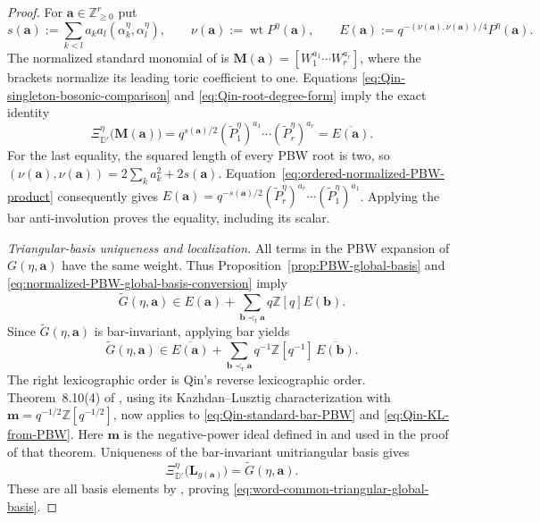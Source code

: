 \documentclass[12pt, reqno]{amsart}
\theoremstyle{plain}
\theoremstyle{definition}
\numberwithin{equation}{section}
\newcommand{\ZZ}{\mathbb{Z}}
\newcommand{\DD}{\mathbb{D}}
\begin{document}
\begin{proof}
For \(\mathbf a\in\ZZ_{\geq0}^r\) put
\[
 s(\mathbf a):=\sum_{k<l}a_ka_l
                         (\alpha_k^\eta,\alpha_l^\eta),
 \qquad
 \nu(\mathbf a):=\operatorname{wt}P^\eta(\mathbf a),
 \qquad
 E(\mathbf a):=q^{-(\nu(\mathbf a),\nu(\mathbf a))/4}
                         P^\eta(\mathbf a).
\]
The normalized standard monomial of
\cite[Section~8.3]{qin2024analogs} is
\(\mathbf M(\mathbf a)=[W_1^{a_1}\cdots W_r^{a_r}]\), where the
brackets normalize its leading toric coefficient to one.
Equations \eqref{eq:Qin-singleton-bosonic-comparison} and
\eqref{eq:Qin-root-degree-form} imply the exact identity
\begin{equation}\label{eq:Qin-standard-bar-PBW}
 \Xi_{\DD'}^\eta\bigl(\mathbf M(\mathbf a)\bigr)
 =q^{s(\mathbf a)/2}
       (\widetilde P_1^\eta)^{a_1}\cdots
       (\widetilde P_r^\eta)^{a_r}
 =\overline{E(\mathbf a)}.
\end{equation}
For the last equality, the squared length of every PBW root is two,
so \((\nu(\mathbf a),\nu(\mathbf a))
 =2\sum_k a_k^2+2s(\mathbf a)\).
Equation~\eqref{eq:ordered-normalized-PBW-product} consequently gives
\(E(\mathbf a)=q^{-s(\mathbf a)/2}
 (\widetilde P_r^\eta)^{a_r}\cdots
 (\widetilde P_1^\eta)^{a_1}\).
Applying the bar anti-involution proves the equality, including its
scalar.

\smallskip
\noindent\emph{Triangular-basis uniqueness and localization.}
All terms in the PBW expansion of \(G(\eta,\mathbf a)\) have the
same weight.  Thus Proposition~\ref{prop:PBW-global-basis} and
\eqref{eq:normalized-PBW-global-basis-conversion} imply
\[
 \widetilde G(\eta,\mathbf a)
 \in E(\mathbf a)+
    \sum_{\mathbf b\prec_{\mathrm r}\mathbf a}q\ZZ[q]E(\mathbf b).
\]
Since \(\widetilde G(\eta,\mathbf a)\) is bar-invariant, applying
bar yields
\begin{equation}\label{eq:Qin-KL-from-PBW}
 \widetilde G(\eta,\mathbf a)
 \in\overline{E(\mathbf a)}+
    \sum_{\mathbf b\prec_{\mathrm r}\mathbf a}
       q^{-1}\ZZ[q^{-1}]\,\overline{E(\mathbf b)}.
\end{equation}
The right lexicographic order is Qin's reverse lexicographic order.
Theorem~8.10(4) of \cite{qin2024analogs}, using its
Kazhdan--Lusztig characterization with
\(\mathbf m=q^{-1/2}\ZZ[q^{-1/2}]\), now applies to
\eqref{eq:Qin-standard-bar-PBW} and \eqref{eq:Qin-KL-from-PBW}.
Here \(\mathbf m\) is the negative-power ideal defined in
\cite[Definition~2.6]{qin2024analogs} and used in the proof of that
theorem.  Uniqueness of the bar-invariant unitriangular basis gives
\[
 \Xi_{\DD'}^\eta
   \bigl(\mathbf L_{g(\mathbf a)}\bigr)
 =\widetilde G(\eta,\mathbf a).
\]
These are all basis elements by
\cite[Lemma~8.11]{qin2024analogs}, proving
\eqref{eq:word-common-triangular-global-basis}.


\end{proof}
\end{document}
